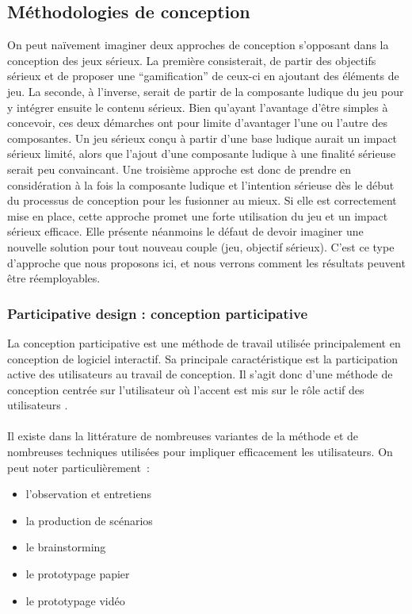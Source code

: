 	
	
	\subsection{Méthodologies de conception}
On peut naïvement imaginer deux approches de conception s’opposant dans la conception des jeux sérieux. La première consisterait, de partir des objectifs sérieux et de proposer une “gamification” de ceux-ci en ajoutant des éléments de jeu. La seconde, à l’inverse, serait de partir de la composante ludique du jeu pour y intégrer ensuite le contenu sérieux. Bien qu’ayant l’avantage d’être simples à concevoir, ces deux démarches ont pour limite d’avantager l’une ou l’autre des composantes. Un jeu sérieux conçu à partir d’une base ludique aurait un impact sérieux limité, alors que l’ajout d’une composante ludique à une finalité sérieuse serait peu convaincant.
Une troisième approche est donc de prendre en considération à la fois la composante ludique et l’intention sérieuse dès le début du processus de conception pour les fusionner au mieux. Si elle est correctement mise en place, cette approche promet une forte utilisation du jeu et un impact sérieux efficace. Elle présente néanmoins le défaut de devoir imaginer une nouvelle solution pour tout nouveau couple (jeu, objectif sérieux). C’est ce type d’approche que nous proposons ici, et nous verrons comment les résultats peuvent être réemployables.

	\subsubsection*{Participative design : conception participative}
La conception participative est une méthode de travail utilisée principalement en conception de logiciel interactif. Sa principale caractéristique est la participation active des utilisateurs au travail de conception. Il s'agit donc d'une méthode de conception centrée sur l'utilisateur où l'accent est mis sur le rôle actif des utilisateurs \cite{wiki:cp}.

\paragraph{}
Il existe dans la littérature de nombreuses variantes de la méthode et de nombreuses techniques utilisées pour impliquer efficacement les utilisateurs. On peut noter particulièrement~:
\begin{itemize}
    \item l'observation et entretiens
    \item la production de scénarios
    \item le brainstorming
    \item le prototypage papier
    \item le prototypage vidéo
\end{itemize}

